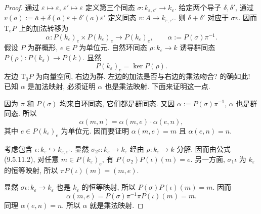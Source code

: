 \begin{proof}
通过 $\varepsilon\mapsto\varepsilon$, $\varepsilon'\mapsto\varepsilon$ 定义第三个同态 $\sigma:k_{\varepsilon,\varepsilon'}\to k_\varepsilon$. 给定两个导子 $\delta,\delta'$, 通过 $v(a):=\bar a+\delta(a)\varepsilon+\delta'(a)\varepsilon'$ 定义同态 $v:A\to k_{\varepsilon,\varepsilon'}$. 则 $\delta+\delta'$ 对应于 $\sigma v$. 因而 $\mathrm T_eP$ 上的加法转移为
\[
 \alpha:P(k_\varepsilon)_e\times P(k_\varepsilon)_e\longrightarrow P(k_\varepsilon)_e,
 \qquad\alpha:=P(\sigma)\pi^{-1}.
\]
假设 $P$ 为群概形, $e\in P$ 为单位元. 自然环同态 $\rho:k_\varepsilon\to k$ 诱导群同态 $P(\rho):P(k_\varepsilon)\to P(k)$. 显然
\begin{equation}\tag{9.5.11.2}\label{ch09s05:eq9.5.11.2}
 P(k_\varepsilon)_e=\ker P(\rho).
\end{equation}
左边 $\mathrm T_0P$ 为向量空间, 右边为群. 左边的加法是否与右边的乘法吻合? 的确如此! 已知 $\alpha$ 是加法映射, 必须证明 $\alpha$ 也是乘法映射. 下面来证明这一点.

因为 $\pi$ 和 $P(\sigma)$ 均来自环同态, 它们都是群同态. 又因 $\alpha:=P(\sigma)\pi^{-1}$, $\alpha$ 也是群同态. 所以
\[
 \alpha(m,n)=\alpha(m,e)\cdot\alpha(e,n),
\]
其中 $e\in P(k_\varepsilon)_e$ 为单位元. 因而要证明 $\alpha(m,e)=m$ 且 $\alpha(e,n)=n$.

考虑包含 $\iota:k_\varepsilon\hookrightarrow k_{\varepsilon,\varepsilon'}$. 显然 $\sigma_2\iota:k_\varepsilon\to k_\varepsilon$ 经由 $\rho:k_\varepsilon\to k$ 分解. 因而由公式 (9.5.11.2), 对任意 $m\in P(k_\varepsilon)_e$, 有 $P(\sigma_2)P(\iota)(m)=e$. 另一方面, $\sigma_1\iota$ 为 $k_\varepsilon$ 的恒等映射, 所以 $\pi P(\iota)(m)=(m,e)$.


显然 $\sigma\iota:k_\varepsilon\to k_\varepsilon$ 也是 $k_\varepsilon$ 的恒等映射, 所以 $P(\sigma)P(\iota)(m)=m$. 因而
\[
 \alpha(m,e)=P(\sigma)\pi^{-1}\pi P(\iota)(m)=m.
\]
同理 $\alpha(e,n)=n$. 所以 $\alpha$ 就是乘法映射.


\end{proof}
